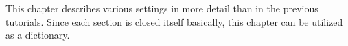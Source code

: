 This chapter describes various settings in more detail
than in the previous tutorials.
Since each section is closed itself basically,
this chapter can be utilized as a dictionary.

